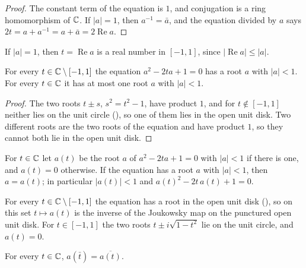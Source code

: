 \begin{proof}
\leanok
The constant term of the equation is $1$, and conjugation is a ring homomorphism of $\mathbb{C}$. If
$|a| = 1$, then $a^{-1} = \bar a$, and the equation divided by $a$ says
$2t = a + a^{-1} = a + \bar a = 2 \operatorname{Re} a$.
\end{proof}

If $|a| = 1$, then $t = \operatorname{Re} a$ is a real number in $[-1, 1]$, since
$|\operatorname{Re} a| \leq |a|$.

\begin{lemma}
\label{lem:daub-joukowsky-root}
\leanok
For every $t \in \mathbb{C} \setminus [-1, 1]$ the equation $a^2 - 2ta + 1 = 0$ has a root $a$ with
$|a| < 1$. For every $t \in \mathbb{C}$ it has at most one root $a$ with $|a| < 1$.
\end{lemma}

\begin{proof}
\leanok
{}
The two roots $t \pm s$, $s^2 = t^2 - 1$, have product $1$, and for $t \notin [-1, 1]$ neither
lies on the unit circle (), so one of them lies in the open
unit disk. Two different roots are the two roots of the equation and have product $1$, so they
cannot both lie in the open unit disk.
\end{proof}

\begin{definition}
\label{def:daub-joukowsky-inv}
\leanok
{}
For $t \in \mathbb{C}$ let $a(t)$ be the root $a$ of $a^2 - 2ta + 1 = 0$ with $|a| < 1$ if there is
one, and $a(t) = 0$ otherwise. If the equation has a root $a$ with $|a| < 1$, then $a = a(t)$;
in particular $|a(t)| < 1$ and $a(t)^2 - 2t \, a(t) + 1 = 0$.
\end{definition}

For every $t \in \mathbb{C} \setminus [-1, 1]$ the equation has a root in the open unit disk
(), so on this set $t \mapsto a(t)$ is the inverse of the
Joukowsky map on the punctured open unit disk. For $t \in [-1, 1]$ the two roots
$t \pm i \sqrt{1 - t^2}$ lie on the unit circle, and $a(t) = 0$.

\begin{lemma}
\label{lem:daub-joukowsky-conj}
\leanok
{}
For every $t \in \mathbb{C}$, $a(\bar t) = \overline{a(t)}$.
\end{lemma}

